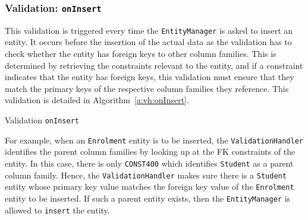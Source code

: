 	\subsubsection{Validation: \texttt{onInsert}}
		This validation is triggered every time the \texttt{EntityManager} is asked to
		insert an entity. It occurs before the insertion of the actual data as the
		validation has to check whether the entity has foreign keys to other column
		families. This is determined by retrieving the  constraints relevant to the
		entity, and if a constraint indicates that the entity has foreign keys,
		this validation must ensure that they match the primary keys of the
		respective column families they reference. This validation is detailed in
		Algorithm~\ref{a:vh:onInsert}.
	
	 	\begin{algorithm}[H]
	 		\caption{Validation \texttt{onInsert}}\label{a:vh:onInsert}
	 	\end{algorithm}
	 	
	 	
For example,  when an \texttt{Enrolment} entity is to be inserted,   the
 \texttt{ValidationHandler} identifies the parent column families  by looking up
 at the \ac{FK} constraints of the entity. In this case, there
 is only \texttt{CONST400} which identifies \texttt{Student} as a parent column
 family. Hence, the \texttt{ValidationHandler} makes sure there is a
 \texttt{Student} entity whose primary key value matches the foreign key value
 of the \texttt{Enrolment} entity to be inserted. If such a parent entity
 exists, then the \texttt{EntityManager} is allowed to \texttt{insert} the entity.
		
		
